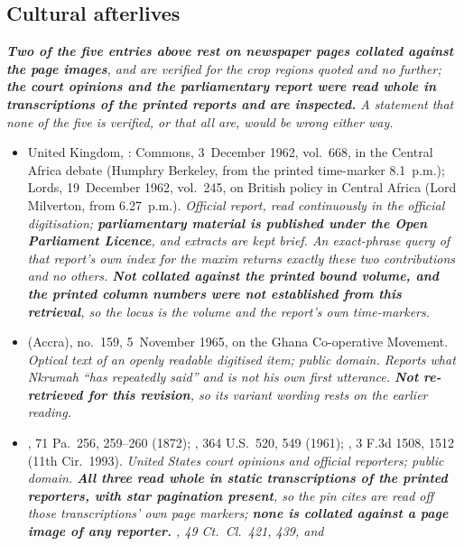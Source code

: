 \subsection*{Cultural afterlives}

\textit{\textbf{Two of the five entries above rest on newspaper pages collated
against the page images}, and are \emph{verified} for the crop regions quoted
and no further; \textbf{the court opinions and the parliamentary report were
read whole in transcriptions of the printed reports and are \emph{inspected}.}
A statement that none of the five is verified, or that all are, would be wrong
either way.}

\begin{itemize}[leftmargin=1.2em, itemsep=0.15em]
\item United Kingdom, : Commons, 3~December 1962,
vol.~668, in the Central Africa debate (Humphry Berkeley, from the printed
time-marker 8.1~p.m.); Lords, 19~December 1962, vol.~245, on British policy in
Central Africa (Lord Milverton, from 6.27~p.m.). \textit{Official report, read
continuously in the official digitisation; \textbf{parliamentary material is
published under the Open Parliament Licence}, and extracts are kept brief. An
exact-phrase query of that report's own index for the maxim returns exactly
these two contributions and no others. \textbf{Not collated against the printed
bound volume, and the printed column numbers were not established from this
retrieval}, so the locus is the volume and the report's own time-markers.}
\item {} (Accra), no.~159, 5~November 1965, on the Ghana
Co-operative Movement. \textit{Optical text of an openly readable digitised
item; public domain. Reports what Nkrumah ``has repeatedly said'' and is not his
own first utterance. \textbf{Not re-retrieved for this revision}, so its variant
wording rests on the earlier reading.}
\item {}, 71 Pa.\ 256, 259--260 (1872); , 364 U.S.\ 520, 549 (1961);
, 3 F.3d 1508, 1512 (11th Cir.\ 1993). \textit{United
States court opinions and official reporters; public domain. \textbf{All three
read whole in static transcriptions of the printed reporters, with star
pagination present}, so the pin cites are read off those transcriptions' own
page markers; \textbf{none is collated against a page image of any reporter.}
, 49 Ct.\ Cl.\ 421, 439, and
}
\end{itemize}
